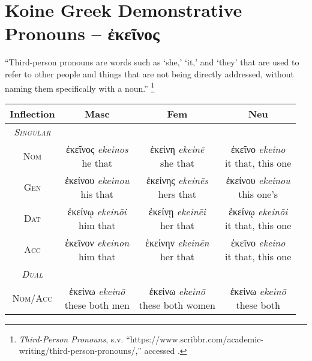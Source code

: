 \documentclass[10pt]{memoir}
\newcommand{\tsc}[1]{\textsc{#1}}
\newcommand{\grc}[1]{\fontspec{Inter}#1}
\newcommand{\trc}[1]{\textit{\fontspec{Tinos}#1}}
\newcommand{\linkfoot}[3]{\footnote{\emph{#1}, s.v. ``{#2},'' accessed \printdate{#3}.}}
\begin{document}
    \section*{Koine Greek Demonstrative Pronouns -- \grc{ἐκεῖνος}}

    ``Third-person pronouns are words such as `she,' `it,' and `they' that are used to refer to other people and things that are not being directly addressed, without naming them specifically with a noun.''
    \linkfoot{Third-Person Pronouns}{https://www.scribbr.com/academic-writing/third-person-pronouns/}{2025-05-13}

    \begin{table}[H]
        \begin{tabular}{c|ccc}
            \textbf{Inflection} & \textbf{Masc} & \textbf{Fem} & \textbf{Neu} \\
            \hline
            \emph{\tsc{Singular}} \\
            \tsc{Nom} & \makecell{\grc{ἐκεῖνος} \trc{ekeinos} \\ \small he that} & \makecell{\grc{ἐκείνη} \trc{ekeinē} \\ \small she that} & \makecell{\grc{ἐκεῖνο} \trc{ekeino} \\ \small it that, this one} \\
            \tsc{Gen} & \makecell{\grc{ἐκείνου} \trc{ekeinou} \\ \small his that} & \makecell{\grc{ἐκείνης} \trc{ekeinēs} \\ \small hers that} & \makecell{\grc{ἐκείνου} \trc{ekeinou} \\ \small this one's} \\
            \tsc{Dat} & \makecell{\grc{ἐκείνῳ} \trc{ekeinōi} \\ \small him that} & \makecell{\grc{ἐκείνῃ} \trc{ekeinēi} \\ \small her that} & \makecell{\grc{ἐκείνῳ} \trc{ekeinōi} \\ \small it that, this one} \\
            \tsc{Acc} & \makecell{\grc{ἐκεῖνον} \trc{ekeinon} \\ \small him that} & \makecell{\grc{ἐκείνην} \trc{ekeinēn} \\ \small her that} & \makecell{\grc{ἐκεῖνο} \trc{ekeino} \\ \small it that, this one} \\
            \hline
            \emph{\tsc{Dual}} \\
            \tsc{Nom/Acc} & \makecell{\grc{ἐκείνω} \trc{ekeinō} \\ \small these both men} & \makecell{\grc{ἐκείνω} \trc{ekeinō} \\ \small these both women} & \makecell{\grc{ἐκείνω} \trc{ekeinō} \\ \small these both} \\

\end{tabular}
\end{table}
\end{document}
